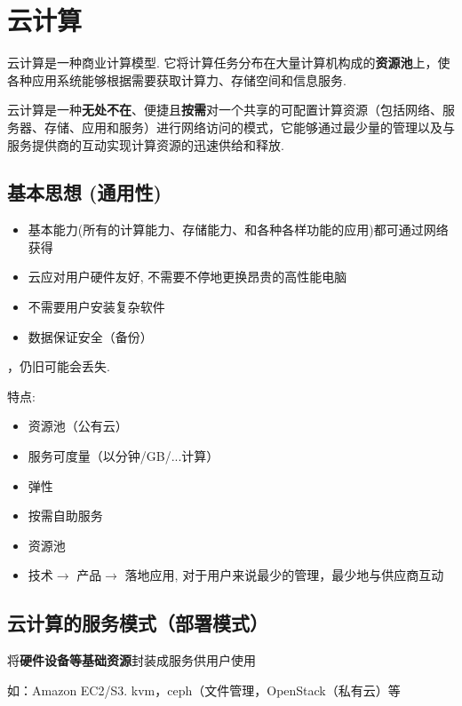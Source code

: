 \section{云计算}

\begin{definition}[云计算]
    云计算是一种商业计算模型. 它将计算任务分布在大量计算机构成的\textbf{资源池}上，使各种应用系统能够根据需要获取计算力、存储空间和信息服务. 

    云计算是一种\textbf{无处不在}、便捷且\textbf{按需}对一个共享的可配置计算资源（包括网络、服务器、存储、应用和服务）进行网络访问的模式，它能够通过最少量的管理以及与服务提供商的互动实现计算资源的迅速供给和释放. 
\end{definition}

\subsection{基本思想 (通用性)}

\begin{itemize}
    \item 基本能力(所有的计算能力、存储能力、和各种各样功能的应用)都可通过网络获得
    \item 云应对用户硬件友好, 不需要不停地更换昂贵的高性能电脑
    \item 不需要用户安装复杂软件
    \item 数据保证安全（备份）
\end{itemize}

，仍旧可能会丢失.

特点:
\begin{itemize}
    \item 资源池（公有云）
    \item 服务可度量（以分钟/GB/...计算）
    \item 弹性
    \item 按需自助服务
    \item 资源池
    \item 技术$\rightarrow$ 产品$\rightarrow$ 落地应用, 对于用户来说最少的管理，最少地与供应商互动
\end{itemize}

\subsection{云计算的服务模式（部署模式）}

\begin{definition}
    将\textbf{硬件设备等基础资源}封装成服务供用户使用

    如：Amazon EC2/S3. kvm，ceph（文件管理，OpenStack（私有云）等
\end{definition}

